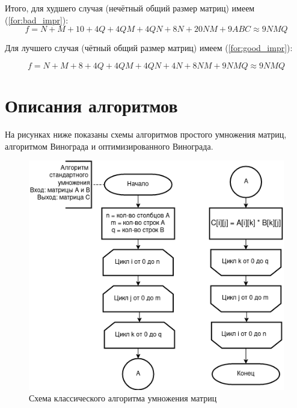 \documentclass[12pt]{report}
\begin{document}
	Итого, для худшего случая (нечётный общий размер матриц) имеем (\ref{for:bad_impr}):
	\begin{equation}
	\label{for:bad_impr}
	f = N + M + 10 + 4Q + 4QM + 4QN + 8N + 20NM + 9ABC \approx 9NMQ
	\end{equation}

	Для лучшего случая (чётный общий размер матриц) имеем (\ref{for:good_impr}):
	
	\begin{equation}
	\label{for:good_impr}
	f = N + M + 8 + 4Q +4QM + 4QN + 4N + 8NM + 9NMQ \approx 9NMQ
	\end{equation}
		
	\section{Описания алгоритмов}
	
	На рисунках ниже показаны схемы алгоритмов простого умножения матриц, алгоритмом Винограда и оптимизированного Винограда.
	
	\begin{figure}[H]
		\centering
		\includegraphics{def}
		\caption{Схема классического алгоритма умножения матриц}
		\label{fig:schema_bucket_1}
	\end{figure}
	
\end{document}
